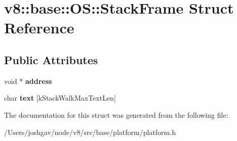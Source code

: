 \hypertarget{structv8_1_1base_1_1_o_s_1_1_stack_frame}{}\section{v8\+:\+:base\+:\+:OS\+:\+:Stack\+Frame Struct Reference}
\label{structv8_1_1base_1_1_o_s_1_1_stack_frame}
\subsection*{Public Attributes}
\begin{DoxyCompactItemize}
\item 
void $\ast$ {\bfseries address}\hypertarget{structv8_1_1base_1_1_o_s_1_1_stack_frame_a65b50acc3996576011bcd572b75c20de}{}\label{structv8_1_1base_1_1_o_s_1_1_stack_frame_a65b50acc3996576011bcd572b75c20de}

\item 
char {\bfseries text} \mbox{[}k\+Stack\+Walk\+Max\+Text\+Len\mbox{]}\hypertarget{structv8_1_1base_1_1_o_s_1_1_stack_frame_a088cd084d2b014debcf372ca326b31f4}{}\label{structv8_1_1base_1_1_o_s_1_1_stack_frame_a088cd084d2b014debcf372ca326b31f4}

\end{DoxyCompactItemize}


The documentation for this struct was generated from the following file\+:\begin{DoxyCompactItemize}
\item 
/\+Users/joshgav/node/v8/src/base/platform/platform.\+h\end{DoxyCompactItemize}
